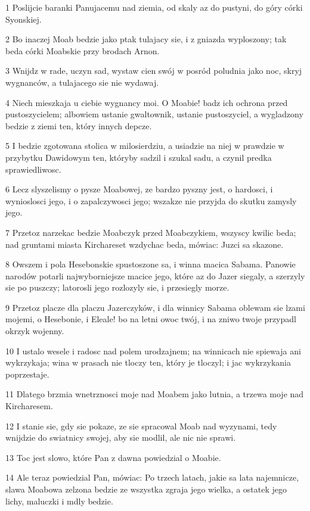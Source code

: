 \par 1 Poslijcie baranki Panujacemu nad ziemia, od skaly az do pustyni, do góry córki Syonskiej.
\par 2 Bo inaczej Moab bedzie jako ptak tulajacy sie, i z gniazda wyploszony; tak beda córki Moabskie przy brodach Arnon.
\par 3 Wnijdz w rade, uczyn sad, wystaw cien swój w posród poludnia jako noc, skryj wygnanców, a tulajacego sie nie wydawaj.
\par 4 Niech mieszkaja u ciebie wygnancy moi. O Moabie! badz ich ochrona przed pustoszycielem; albowiem ustanie gwaltownik, ustanie pustoszyciel, a wygladzony bedzie z ziemi ten, który innych depcze.
\par 5 I bedzie zgotowana stolica w milosierdziu, a usiadzie na niej w prawdzie w przybytku Dawidowym ten, któryby sadzil i szukal sadu, a czynil predka sprawiedliwosc.
\par 6 Lecz slyszelismy o pysze Moabowej, ze bardzo pyszny jest, o hardosci, i wynioslosci jego, i o zapalczywosci jego; wszakze nie przyjda do skutku zamysly jego.
\par 7 Przetoz narzekac bedzie Moabczyk przed Moabczykiem, wszyscy kwilic beda; nad gruntami miasta Kirchareset wzdychac beda, mówiac: Juzci sa skazone.
\par 8 Owszem i pola Hesebonskie spustoszone sa, i winna macica Sabama. Panowie narodów potarli najwyborniejsze macice jego, które az do Jazer siegaly, a szerzyly sie po puszczy; latorosli jego rozlozyly sie, i przesiegly morze.
\par 9 Przetoz placze dla placzu Jazerczyków, i dla winnicy Sabama oblewam sie lzami mojemi, o Hesebonie, i Eleale! bo na letni owoc twój, i na zniwo twoje przypadl okrzyk wojenny.
\par 10 I ustalo wesele i radosc nad polem urodzajnem; na winnicach nie spiewaja ani wykrzykaja; wina w prasach nie tloczy ten, który je tloczyl; i jac wykrzykania poprzestaje.
\par 11 Dlatego brzmia wnetrznosci moje nad Moabem jako lutnia, a trzewa moje nad Kircharesem.
\par 12 I stanie sie, gdy sie pokaze, ze sie spracowal Moab nad wyzynami, tedy wnijdzie do swiatnicy swojej, aby sie modlil, ale nic nie sprawi.
\par 13 Toc jest slowo, które Pan z dawna powiedzial o Moabie.
\par 14 Ale teraz powiedzial Pan, mówiac: Po trzech latach, jakie sa lata najemnicze, slawa Moabowa zelzona bedzie ze wszystka zgraja jego wielka, a ostatek jego lichy, maluczki i mdly bedzie.

